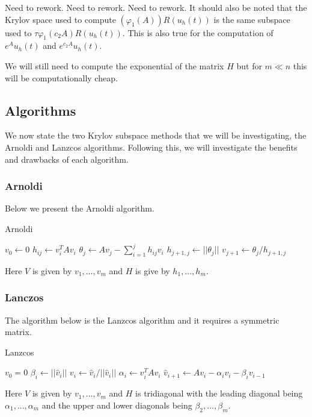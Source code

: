 Need to rework.
Need to rework.
Need to rework.
It should also be noted that the Krylov space used to compute $(\varphi_1(A))R(u_h(t))$ is the same subspace used to $\tau\varphi_1(c_2 A)R(u_h(t))$.
This is also true for the computation of $e^{A}u_h(t)$ and $e^{c_2A}u_h(t)$.

We will still need to compute the exponential of the matrix $H$ but for $m\ll n$ this will be computationally cheap.

\subsection{Algorithms}
We now state the two Krylov subspace methods that we will be investigating, the Arnoldi and Lanzcos algorithms.
Following this, we will investigate the benefits and drawbacks of each algorithm.

\subsubsection{Arnoldi}
Below we present the Arnoldi algorithm.
\begin{algorithm}[H]
\caption{Arnoldi \cite{Fan2018}} %
\begin{algorithmic}
\State $v_0 \gets 0$
\State$h_{ij} \gets v_i^T A v_i$
\EndFor
\State$\theta_j \gets Av_j - \sum^j_{i=1} h_{ij}v_i$
\State$h_{j+1,j} \gets ||\theta_j||$
\State$v_{j+1} \gets \theta_j/h_{j+1,j}$
\EndFor
\EndProcedure
\end{algorithmic}
\end{algorithm}
Here $V$ is given by $v_1,...,v_m$ and $H$ is give by $h_1,...,h_m$.\\

\subsubsection{Lanczos}
The algorithm below is the Lanzcos algorithm and it requires a symmetric matrix. \cite{Moler2003}
\begin{algorithm}[H]
\caption{Lanzcos\cite{OJALVO1970}}
\begin{algorithmic}
\State $v_0 = 0$
\State$\beta_i \gets || \hat v_i ||$
\State$v_i \gets \hat v_i / || \hat v_i ||$
\State$\alpha_i \gets v_i^T A v_i$
\State$\hat v_{i+1} \gets Av_i - \alpha_iv_i - \beta_iv_{i-1}$
\EndFor
\EndProcedure
\end{algorithmic}
\end{algorithm}
Here $V$ is given by ${v_1,...,v_m}$ and $H$ is tridiagonal with the leading diagonal being $\alpha_1, ..., \alpha_m$ and the upper and lower diagonals being $\beta_2,...,\beta_m$.
